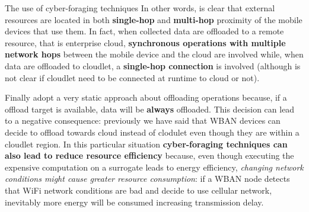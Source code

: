 \documentclass[10pt]{beamer}
\begin{document}
\begin{frame}{The use of cyber-foraging techniques}
In other words, is clear that external resources are located in both \textbf{single-hop} and \textbf{multi-hop} proximity of the mobile devices that use them. In fact, when collected data are offloaded to a remote resource, that is enterprise cloud, \textbf{synchronous operations with multiple network hops} between the mobile device and the cloud are involved while, when data are offloaded to cloudlet, a \textbf{single-hop connection} is involved (although is not clear if cloudlet need to be connected at runtime to cloud or not).

Finally \citet{MSAReport} adopt a very static approach about offloading operations because, if a offload target is available, data will be \textbf{always} offloaded. This decision can lead to a negative consequence: previously we have said that WBAN devices can decide to offload towards cloud instead of clodulet even though they are within a cloudlet region. In this particular situation \textbf{cyber-foraging techniques can also lead to reduce resource efficiency} because, even though executing the expensive computation on a surrogate leads to energy efficiency, \textit{changing network conditions might cause greater resource consumption}: if a WBAN node detects that WiFi network conditions are bad and decide to use cellular network, inevitably more energy will be consumed increasing transmission delay.

\end{frame} 
\end{document}
